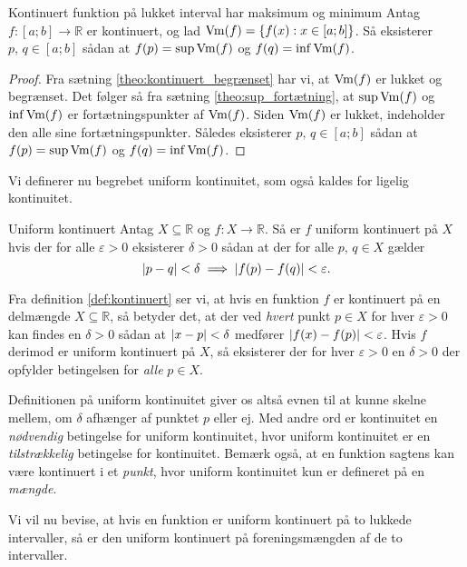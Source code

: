 \begin{theorem}[label=theo:kontinuert_maks]{Kontinuert funktion på lukket interval har maksimum og minimum}{}
  Antag $f:[a;b] \to \mathbb{R}$ er kontinuert, og lad $\operatorname{Vm}(f)=\{ f(x):x \in [a;b] \} $.
  Så eksisterer $p,\,q \in [a;b]$ sådan at $f(p)=\sup \operatorname{Vm}(f)$ og $f(q)=\inf \operatorname{Vm}(f)$.
\end{theorem}
\begin{proof} 
  Fra sætning \ref{theo:kontinuert_begrænset} har vi, at $\operatorname{Vm} (f)$ er lukket og begrænset. 
  Det følger så fra sætning \ref{theo:sup_fortætning}, at $\sup \operatorname{Vm} (f)$ og $\inf \operatorname{Vm} (f)$ er fortætningspunkter af $\operatorname{Vm} (f)$.
  Siden $\operatorname{Vm} (f)$ er lukket, indeholder den alle sine fortætningspunkter. 
  Således eksisterer $p,\,q \in [a;b]$ sådan at $f(p)=\sup \operatorname{Vm}(f)$ og $f(q)=\inf \operatorname{Vm}(f)$.
\end{proof}

Vi definerer nu begrebet uniform kontinuitet, som også kaldes for ligelig kontinuitet.

\begin{definition}[label=def:uniform_kontinuert]{Uniform kontinuert}{}
  Antag $X \subseteq \mathbb{R}$ og $f:X \to \mathbb{R}$. 
  Så er $f$ uniform kontinuert på $X$ hvis der for alle $\varepsilon >0$ eksisterer $\delta >0$ sådan at der for alle $p,\,q \in X$ gælder
  \[
  \abs{p-q} < \delta \implies \abs{f(p)-f(q)}<\varepsilon .  
  \] 
\end{definition}

Fra definition \ref{def:kontinuert} ser vi, at hvis en funktion $f$ er kontinuert på en delmængde $X \subseteq \mathbb{R}$, så betyder det, at der ved \textit{hvert} punkt $p \in X$ for hver $\varepsilon >0$ kan findes en $\delta >0$ sådan at $\abs{x-p} <\delta $ medfører $\abs{f(x)-f(p)} < \varepsilon  $.
Hvis $f$ derimod er uniform kontinuert på $X$, så eksisterer der for hver $\varepsilon >0$ en $\delta >0$ der opfylder betingelsen for \textit{alle} $p \in X$. 

Definitionen på uniform kontinuitet giver os altså evnen til at kunne skelne mellem, om $\delta $ afhænger af punktet $p$ eller ej. 
Med andre ord er kontinuitet en \textit{nødvendig} betingelse for uniform kontinuitet, hvor uniform kontinuitet er en \textit{tilstrækkelig} betingelse for kontinuitet.
Bemærk også, at en funktion sagtens kan være kontinuert i et \textit{punkt}, hvor uniform kontinuitet kun er defineret på en \textit{mængde}.

Vi vil nu bevise, at hvis en funktion er uniform kontinuert på to lukkede intervaller, så er den uniform kontinuert på foreningsmængden af de to intervaller.


